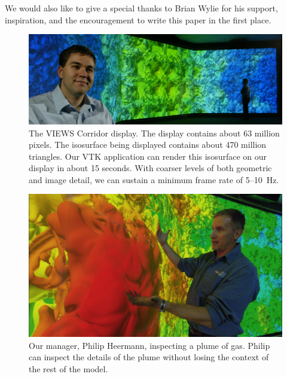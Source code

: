 \documentclass{acmsiggraph}
\newcommand{\sticky}[1]{}
\begin{document}
  We would also like to give a special thanks to Brian Wylie for his
  support, inspiration, and the encouragement to write this paper in the
  first place.


  
  

  \begin{figure}[!p]
    \includegraphics[width=\textwidth]{images/FullWall}
    \caption{The VIEWS Corridor display.  The display contains about 63
    million pixels.  The isosurface being displayed contains about 470
    million triangles.  Our VTK application can render this isosurface on
    our display in about 15 seconds.  With coarser levels of both geometric
    and image detail, we can sustain a minimum frame rate of 5--10~Hz.
    \sticky{Might want to verify that.}}
    \label{fig:fullwall}
  \end{figure}

  \begin{figure}[!p]
    \includegraphics[width=\textwidth]{images/PhilwBlob}
    \caption{Our manager, Philip Heermann, inspecting a plume of gas.
    Philip can inspect the details of the plume without losing the context
    of the rest of the model.}
    \label{fig:philwblob}
  \end{figure}
\end{document}
